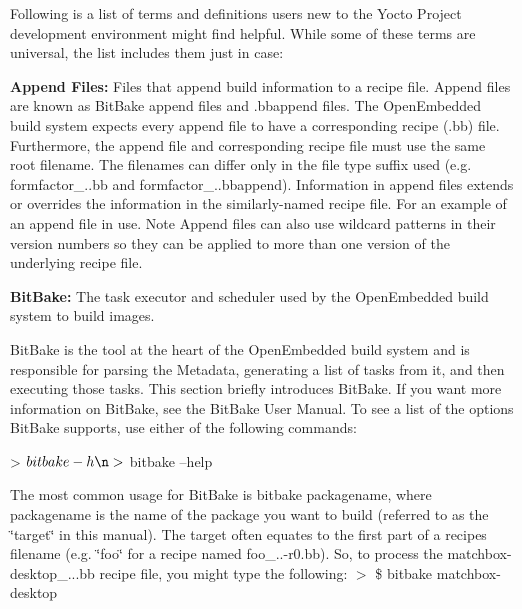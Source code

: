 Following is a list of terms and definitions users new to the Yocto Project development environment might find helpful. While some of these terms are universal, the list includes them just in case\+:


\begin{DoxyItemize}
\item {\bfseries Append Files\+:} Files that append build information to a recipe file. Append files are known as Bit\+Bake append files and .bbappend files. The Open\+Embedded build system expects every append file to have a corresponding recipe (.bb) file. Furthermore, the append file and corresponding recipe file must use the same root filename. The filenames can differ only in the file type suffix used (e.\+g. formfactor\+\_..\+bb and formfactor\+\_..\+bbappend). Information in append files extends or overrides the information in the similarly-\/named recipe file. For an example of an append file in use. Note Append files can also use wildcard patterns in their version numbers so they can be applied to more than one version of the underlying recipe file.
\item {\bfseries Bit\+Bake\+:} The task executor and scheduler used by the Open\+Embedded build system to build images.

Bit\+Bake is the tool at the heart of the Open\+Embedded build system and is responsible for parsing the Metadata, generating a list of tasks from it, and then executing those tasks. This section briefly introduces Bit\+Bake. If you want more information on Bit\+Bake, see the Bit\+Bake User Manual. To see a list of the options Bit\+Bake supports, use either of the following commands\+: \begin{DoxyVerb}>       $ bitbake -h\n
>       $ bitbake --help
\end{DoxyVerb}


The most common usage for Bit\+Bake is bitbake packagename, where packagename is the name of the package you want to build (referred to as the \char`\"{}target\char`\"{} in this manual). The target often equates to the first part of a recipe\textquotesingle{}s filename (e.\+g. \char`\"{}foo\char`\"{} for a recipe named foo\+\_..-\/r0.\+bb). So, to process the matchbox-\/desktop\+\_...\+bb recipe file, you might type the following\+: $>$ \$ bitbake matchbox-\/desktop


\end{DoxyItemize}
